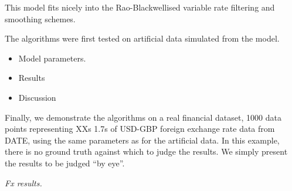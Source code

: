 \documentclass[journal]{IEEEtran}
\newenvironment{meta}[0]{\color{red} \em}{}
\begin{document}
This model fits nicely into the Rao-Blackwellised variable rate filtering and smoothing schemes.

The algorithms were first tested on artificial data simulated from the model.

\begin{meta}
\begin{itemize}
	\item Model parameters.
	\item Results
	\item Discussion
\end{itemize}
\end{meta}

Finally, we demonstrate the algorithms on a real financial dataset, 1000 data points representing XXs 1.7s of USD-GBP foreign exchange rate data from DATE, using the same parameters as for the artificial data. In this example, there is no ground truth against which to judge the results. We simply present the results to be judged ``by eye''.

\begin{meta}
Fx results.
\end{meta}




%
%

\end{document}
